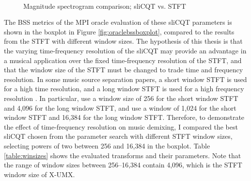 \documentclass[report.tex]{subfiles}
\begin{document}
\begin{figure}[ht]
	\centering
	\\
	\caption{Magnitude spectrogram comparison; sliCQT vs. STFT}
	\label{fig:bipolarslicqs}
\end{figure}

The BSS metrics of the MPI oracle evaluation of these sliCQT parameters is shown in the boxplot in Figure \ref{fig:oraclebssboxplot}, compared to the results from the STFT with different window sizes. The hypothesis of this thesis is that the varying time-frequency resolution of the sliCQT may provide an advantage in a musical application over the fixed time-frequency resolution of the STFT, and that the window size of the STFT must be changed to trade time and frequency resolution. In some music source separation papers, a short window STFT is used for a high time resolution, and a long window STFT is used for a high frequency resolution \parencite{fitzgerald2, driedger}. In particular, \textcite{driedger} use a window size of 256 for the short window STFT and 4,096 for the long window STFT, and \textcite{fitzgerald2} use a window of 1,024 for the short window STFT and 16,384 for the long window STFT. Therefore, to demonstrate the effect of time-frequency resolution on music demixing, I compared the best sliCQT chosen from the parameter search with different STFT window sizes, selecting powers of two between 256 and 16,384 in the boxplot. Table \ref{table:winsizes} shows the evaluated transforms and their parameters. Note that the range of window sizes between 256--16,384 contain 4,096, which is the STFT window size of X-UMX.
\end{document}
